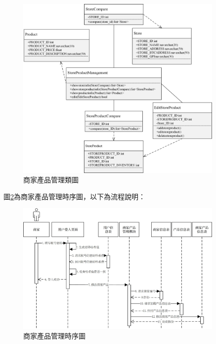 	\begin{figure}[!htbp]
		\centering
		\includegraphics[width = 0.9\textwidth]{c2.jpg}
		\caption{商家產品管理類圖}\label{c2}
	\end{figure}

	圖\ref{time3}為商家產品管理時序圖，以下為流程說明：

	\begin{figure}[!htbp]
		\centering
		\includegraphics[width = 0.9\textwidth]{time3.jpg}
		\caption{商家產品管理時序圖}\label{time3}
	\end{figure}

